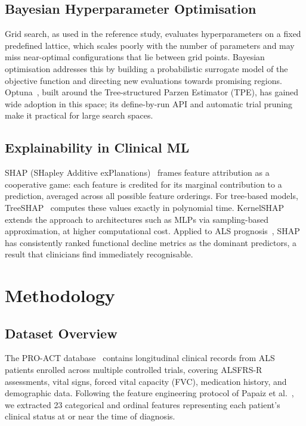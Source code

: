 \documentclass[a4paper,twoside]{article}
\begin{document}
\subsection{Bayesian Hyperparameter Optimisation}

Grid search, as used in the reference study, evaluates hyperparameters on a fixed
predefined lattice, which scales poorly with the number of parameters and may miss
near-optimal configurations that lie between grid points. Bayesian optimisation
addresses this by building a probabilistic surrogate model of the objective
function and directing new evaluations towards promising regions. Optuna~\cite{optuna2019}, built around the Tree-structured Parzen Estimator
(TPE), has gained wide adoption in this space; its define-by-run API and
automatic trial pruning make it practical for large search spaces.

\subsection{Explainability in Clinical ML}

SHAP (SHapley Additive exPlanations)~\cite{lundberg2017shap} frames feature
attribution as a cooperative game: each feature is credited for its marginal
contribution to a prediction, averaged across all possible feature orderings.
For tree-based models, TreeSHAP~\cite{lundberg2020treeshap} computes these values
exactly in polynomial time. KernelSHAP extends the approach to architectures such
as MLPs via sampling-based approximation, at higher computational cost. Applied
to ALS prognosis~\cite{Anani2023}, SHAP has consistently ranked functional decline
metrics as the dominant predictors, a result that clinicians find immediately
recognisable.


\section{Methodology}
\label{sec:methodology}

\subsection{Dataset Overview}

The PRO-ACT database~\cite{PROACT} contains longitudinal clinical records from
ALS patients enrolled across multiple controlled trials, covering ALSFRS-R
assessments, vital signs, forced vital capacity (FVC), medication history, and
demographic data. Following the feature engineering protocol of
Papaiz et al.~\cite{Papaiz2024}, we extracted 23 categorical and ordinal
features representing each patient's clinical status at or near the time of
diagnosis.
\end{document}
